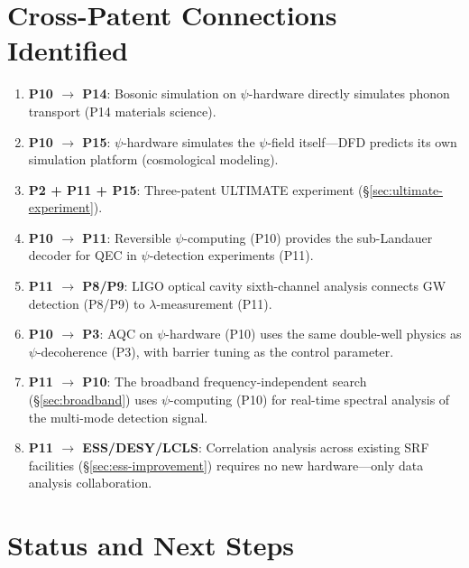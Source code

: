 \documentclass[11pt]{article}
\theoremstyle{definition}
\theoremstyle{remark}
\begin{document}
\section*{Cross-Patent Connections Identified}

\begin{enumerate}[nosep]
\item \textbf{P10 $\to$ P14}: Bosonic simulation on $\psi$-hardware
directly simulates phonon transport (P14 materials science).
\item \textbf{P10 $\to$ P15}: $\psi$-hardware simulates the $\psi$-field
itself---DFD predicts its own simulation platform (cosmological modeling).
\item \textbf{P2 + P11 + P15}: Three-patent ULTIMATE experiment
(\S\ref{sec:ultimate-experiment}).
\item \textbf{P10 $\to$ P11}: Reversible $\psi$-computing (P10) provides
the sub-Landauer decoder for QEC in $\psi$-detection experiments (P11).
\item \textbf{P11 $\to$ P8/P9}: LIGO optical cavity sixth-channel
analysis connects GW detection (P8/P9) to $\lambda$-measurement (P11).
\item \textbf{P10 $\to$ P3}: AQC on $\psi$-hardware (P10) uses the
same double-well physics as $\psi$-decoherence (P3), with barrier
tuning as the control parameter.
\item \textbf{P11 $\to$ P10}: The broadband frequency-independent
search (\S\ref{sec:broadband}) uses $\psi$-computing (P10) for real-time
spectral analysis of the multi-mode detection signal.
\item \textbf{P11 $\to$ ESS/DESY/LCLS}: Correlation analysis across
existing SRF facilities (\S\ref{sec:ess-improvement}) requires no new
hardware---only data analysis collaboration.
\end{enumerate}


\section*{Status and Next Steps}
\end{document}
